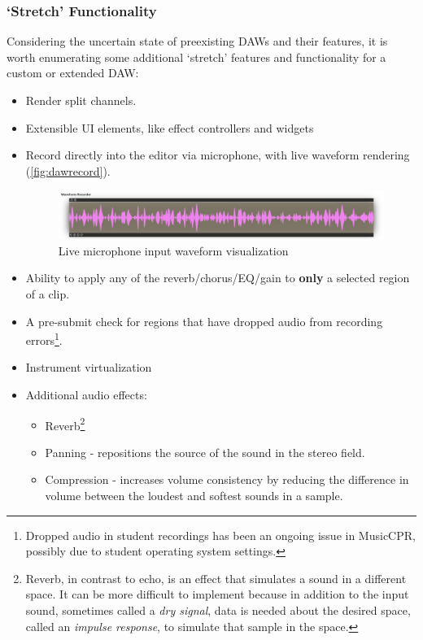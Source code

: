 \documentclass[manuscript,screen,review]{acmart}
\begin{document}
\subsubsection{`Stretch' Functionality}
Considering the uncertain state of preexisting DAWs and their features, it is worth enumerating some additional `stretch' features and functionality for a custom or extended DAW:
\begin{itemize}
    \item Render split channels.
    \item Extensible UI elements, like effect controllers and widgets
    \item Record directly into the editor via microphone, with live waveform rendering (\autoref{fig:dawrecord}).
    \begin{figure}[H]
        \centering
        \includegraphics[width=1\linewidth]{proposal/images/daw-recorder.png}
        \caption{Live microphone input waveform visualization}
        \label{fig:dawrecord}
    \end{figure}

    
    \item Ability to apply any of the reverb/chorus/EQ/gain to \textbf{only} a selected region of a clip.
    
    \item A pre-submit check for regions that have dropped audio from recording errors\footnote{Dropped audio in student recordings has been an ongoing issue in MusicCPR, possibly due to student operating system settings.}.
    
    \item Instrument virtualization
    
    \item Additional audio effects:
        \begin{itemize}
            \item Reverb\footnote{Reverb, in contrast to echo, is an effect that simulates a sound in a different space. It can be more difficult to implement because in addition to the input sound, sometimes called a \textit{dry signal}, data is needed about the desired space, called an \textit{impulse response}, to simulate that sample in the space.}
            \item Panning - repositions the source of the sound in the stereo field. 
            \item Compression - increases volume consistency by reducing the difference in volume between the loudest and softest sounds in a sample.
        \end{itemize}
        

\end{itemize}
\end{document}
